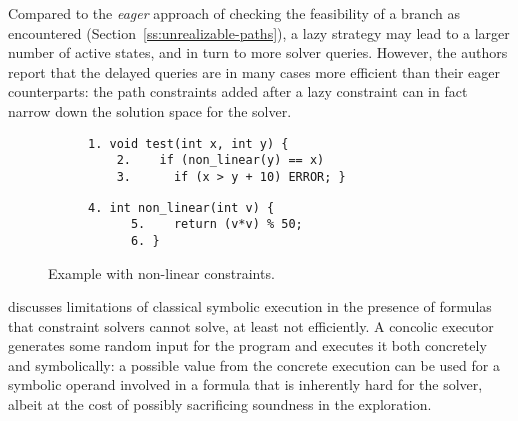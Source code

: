 Compared to the {\em eager} approach of checking the feasibility of a branch as encountered (Section~\ref{ss:unrealizable-paths}), a lazy strategy may lead to a larger number of active states, and in turn to more solver queries. However, the authors report that the delayed queries are in many cases more efficient than their eager counterparts: the path constraints added after a lazy constraint can in fact narrow down the solution space for the solver.

\begin{figure}[t]
  \begin{center}
  \begin{subfigure}{.43\textwidth}
    \begin{lstlisting}[basicstyle=\ttfamily\scriptsize]
    1. void test(int x, int y) {
    2.    if (non_linear(y) == x) 
    3.      if (x > y + 10) ERROR; }
    \end{lstlisting}
  \end{subfigure}%
    \begin{subfigure}{.43\textwidth}
    \begin{lstlisting}[basicstyle=\ttfamily\scriptsize]
      4. int non_linear(int v) {
      5.    return (v*v) % 50;
      6. }
    \end{lstlisting}
  \end{subfigure}%
  \end{center}
  \vspace{-4.0mm}
  \caption{Example with non-linear constraints.}
  \label{fi:non-linear-constraints}
\end{figure}


\cite{CS-CACM13} discusses limitations of classical symbolic execution in the presence of formulas that constraint solvers cannot solve, at least not efficiently. A concolic executor generates some random input for the program and executes it both concretely and symbolically: a possible value from the concrete execution can be used for a symbolic operand involved in a formula that is inherently hard for the solver, albeit at the cost of possibly sacrificing soundness in the exploration. 


